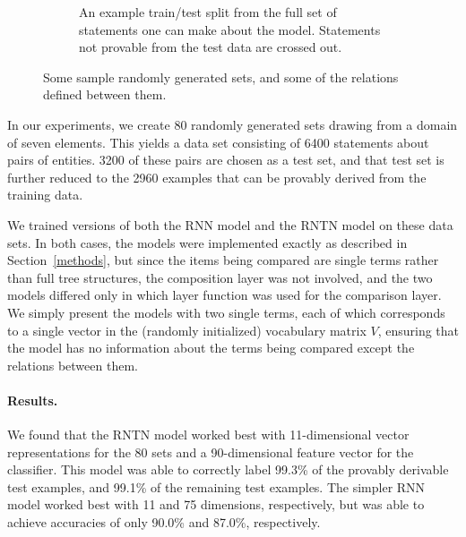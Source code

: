 \begin{figure}[htp]
\begin{subfigure}[t]{0.5\textwidth}
    \caption{An example train/test split from the full set
      of statements one can make about the model.
      Statements not provable from the test data are crossed out.}
  \end{subfigure}  
  \caption{Some sample randomly generated sets, and some of the relations defined between them.}
  \label{lattice-figure}
\end{figure} 


In our experiments, we create 80 randomly generated sets drawing from
a domain of seven elements. This yields a data set consisting of
6400 statements about pairs of entities. 3200 of these pairs are
chosen as a test set, and that test set is further reduced to the 2960
examples that can be provably derived from the training data.

We trained versions of both the RNN model and the RNTN model on these
data sets. In both cases, the models were implemented exactly as
described in Section~\ref{methods}, but since the items being compared
are single terms rather than full tree structures, the composition
layer was not involved, and the two models differed only in which
layer function was used for the comparison layer. We simply present
the models with two single terms, each of which corresponds to a
single vector in the (randomly initialized) vocabulary matrix $V$,
ensuring that the model has no information about the terms being
compared except the relations between them. 

\paragraph{Results.} We found that the RNTN model worked best with 11-dimensional vector representations for the
80 sets and a 90-dimensional feature vector for the classifier. This
model was able to correctly label 99.3\% of the provably derivable test
examples, and 99.1\% of the remaining test examples. The simpler RNN model
worked best with 11 and 75 dimensions, respectively, but was able to
achieve accuracies of only 90.0\% and 87.0\%, respectively.

